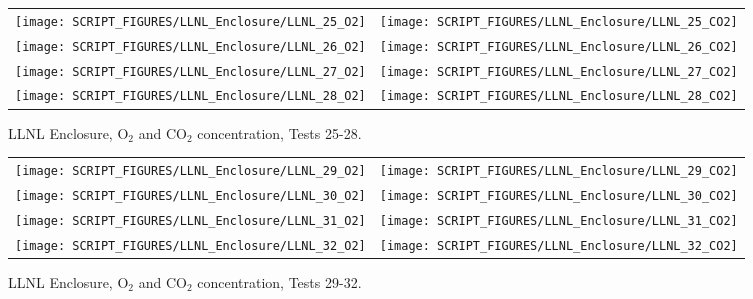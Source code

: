 \begin{figure}[p]
\begin{tabular*}{\textwidth}{l@{\extracolsep{\fill}}r}
\texttt{[image: SCRIPT\_FIGURES/LLNL\_Enclosure/LLNL\_25\_O2]} &
\texttt{[image: SCRIPT\_FIGURES/LLNL\_Enclosure/LLNL\_25\_CO2]} \\
\texttt{[image: SCRIPT\_FIGURES/LLNL\_Enclosure/LLNL\_26\_O2]} &
\texttt{[image: SCRIPT\_FIGURES/LLNL\_Enclosure/LLNL\_26\_CO2]} \\
\texttt{[image: SCRIPT\_FIGURES/LLNL\_Enclosure/LLNL\_27\_O2]} &
\texttt{[image: SCRIPT\_FIGURES/LLNL\_Enclosure/LLNL\_27\_CO2]} \\
\texttt{[image: SCRIPT\_FIGURES/LLNL\_Enclosure/LLNL\_28\_O2]} &
\texttt{[image: SCRIPT\_FIGURES/LLNL\_Enclosure/LLNL\_28\_CO2]}
\end{tabular*}
\caption[LLNL Enclosure, O$_2$ and CO$_2$ concentration, Tests 25-28]{LLNL Enclosure, O$_2$ and CO$_2$ concentration, Tests 25-28.}
\label{LLNL_Gas_7}
\end{figure}

\begin{figure}[p]
\begin{tabular*}{\textwidth}{l@{\extracolsep{\fill}}r}
\texttt{[image: SCRIPT\_FIGURES/LLNL\_Enclosure/LLNL\_29\_O2]} &
\texttt{[image: SCRIPT\_FIGURES/LLNL\_Enclosure/LLNL\_29\_CO2]} \\
\texttt{[image: SCRIPT\_FIGURES/LLNL\_Enclosure/LLNL\_30\_O2]} &
\texttt{[image: SCRIPT\_FIGURES/LLNL\_Enclosure/LLNL\_30\_CO2]} \\
\texttt{[image: SCRIPT\_FIGURES/LLNL\_Enclosure/LLNL\_31\_O2]} &
\texttt{[image: SCRIPT\_FIGURES/LLNL\_Enclosure/LLNL\_31\_CO2]} \\
\texttt{[image: SCRIPT\_FIGURES/LLNL\_Enclosure/LLNL\_32\_O2]} &
\texttt{[image: SCRIPT\_FIGURES/LLNL\_Enclosure/LLNL\_32\_CO2]}
\end{tabular*}
\caption[LLNL Enclosure, O$_2$ and CO$_2$ concentration, Tests 29-32]{LLNL Enclosure, O$_2$ and CO$_2$ concentration, Tests 29-32.}
\label{LLNL_Gas_8}
\end{figure}

